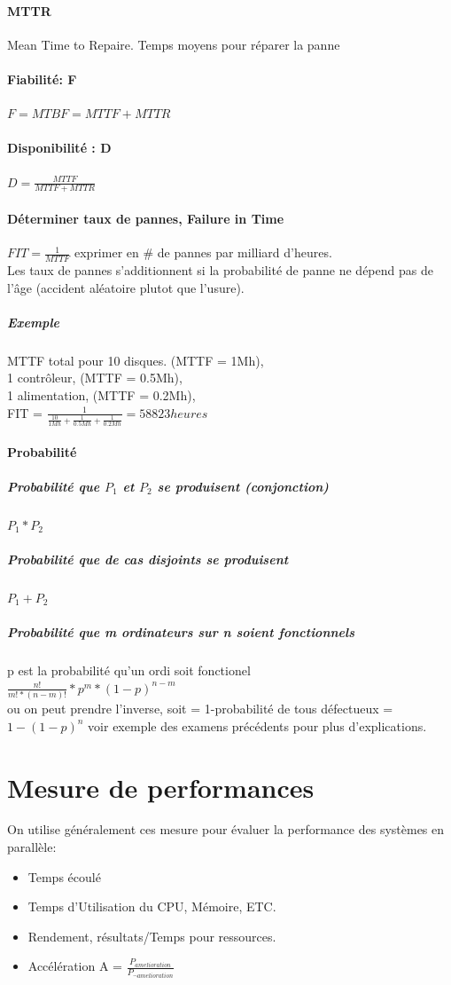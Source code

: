 \documentclass[oneside]{book}
\begin{document}
\paragraph{MTTR} Mean Time to Repaire. Temps moyens pour réparer la panne
\paragraph{Fiabilité: F} $F = MTBF = MTTF + MTTR$
\paragraph{Disponibilité : D} $D = \frac{MTTF}{MTTF+MTTR}$
\paragraph{Déterminer taux de pannes, Failure in Time}$FIT = \frac{1}{MTTF}$ exprimer en \# de pannes par milliard d'heures. \\
Les taux de pannes s'additionnent si la probabilité de panne ne dépend pas de l'âge (accident aléatoire plutot que l'usure).
\subparagraph{Exemple} MTTF total pour 10 disques.
(MTTF = 1Mh), \\
1 contrôleur, (MTTF = 0.5Mh),\\
1 alimentation, (MTTF = 0.2Mh),\\
FIT = $\frac{1}{\frac{10}{1Mh} + \frac{1}{0.5Mh} + \frac{1}{0.2Mh}} = 58823 heures$

\paragraph{Probabilité}
\subparagraph{Probabilité que $P_1$ et $P_2$ se produisent (conjonction)} $P_1 * P_2$
\subparagraph{Probabilité que de cas disjoints se produisent} $P_1 + P_2$
\subparagraph{Probabilité que m ordinateurs sur n soient fonctionnels}
p est la probabilité qu'un ordi soit fonctionel\\
$\frac{n!}{m! *(n-m)!}*p^{m}*(1-p)^{n-m}$ \\
ou on peut prendre l'inverse, soit = 1-probabilité de tous défectueux = $1 - (1-p)^n$
voir exemple des examens précédents pour plus d'explications.

\section{Mesure de performances}
On utilise généralement ces mesure pour évaluer la performance des systèmes en parallèle:
\begin{itemize}
\item Temps écoulé
\item Temps d'Utilisation du CPU, Mémoire, ETC.
\item Rendement, résultats/Temps pour ressources.
\item Accélération A = $\frac{P_{amelioration}}{P_{\neg amelioration}}$
\end{itemize}
\end{document}
